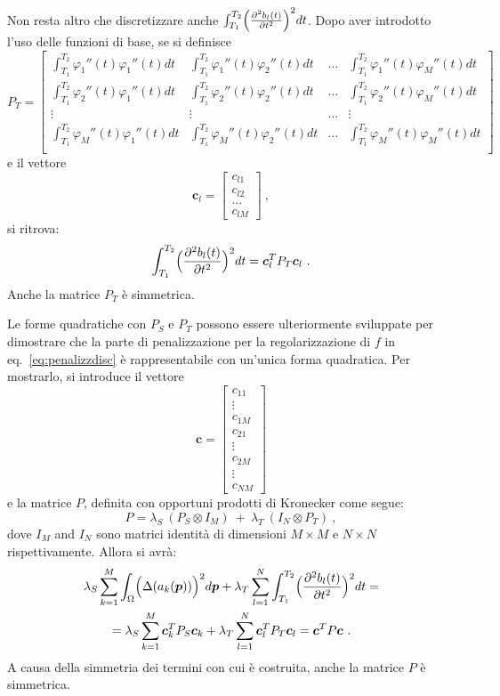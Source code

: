 \documentclass[a4paper,11pt,twoside,openright]{book}							%
\begin{document}
Non resta altro che discretizzare anche $\int_{T_1}^{T_2} \Bigl( \frac{\partial^2   b_l(t)   }{\partial t ^2} \Bigr)^2 dt$. Dopo aver introdotto l'uso delle funzioni di base, se si definisce 
 $$ P_T = \begin{bmatrix}
\int_{T_1}^{T_2} \varphi_1''(t) \varphi_1''(t) dt  & \int_{T_1}^{T_2} \varphi_1''(t) \varphi_2''(t) dt & \hdots & \int_{T_1}^{T_2} \varphi_1''(t) \varphi_M''(t) dt  \\
\int_{T_1}^{T_2} \varphi_2''(t) \varphi_1''(t) dt  & \int_{T_1}^{T_2} \varphi_2''(t) \varphi_2''(t) dt & \hdots & \int_{T_1}^{T_2} \varphi_2''(t) \varphi_M''(t) dt  \\
\vdots & \vdots & \hdots & \vdots \\
\int_{T_1}^{T_2} \varphi_M''(t) \varphi_1''(t) dt  & \int_{T_1}^{T_2} \varphi_M''(t) \varphi_2''(t) dt & \hdots & \int_{T_1}^{T_2} \varphi_M''(t) \varphi_M''(t) dt  \\
\end{bmatrix} $$
e il vettore $$
\bm{c}_l =
\begin{bmatrix}
c_{l1} \\ c_{l2} \\ \hdots \\ c_{lM}
\end{bmatrix} \ ,$$ si ritrova:
$$
\int_{T_1}^{T_2} \Bigl( \frac{\partial^2   b_l(t)   }{\partial t ^2} \Bigr)^2 dt = \bm{c}_l^T  P_T \bm{c}_l \ .
$$
Anche la matrice $P_T$ è simmetrica.

Le forme quadratiche con $P_S$ e $P_T$ possono essere ulteriormente sviluppate per dimostrare che la parte di penalizzazione per la regolarizzazione di $f$ in eq.~\ref{eq:penalizzdisc} è rappresentabile con un'unica forma quadratica. Per mostrarlo, si introduce il vettore
$$\bm c =
\begin{bmatrix}
c_{11}  \\
\vdots\\
c_{1M}  \\
c_{21}  \\
\vdots\\
c_{2M}  \\
\vdots\\
c_{NM}
\end{bmatrix}
$$
e la matrice $P$, definita con opportuni prodotti di Kronecker come segue:
$$
P = \lambda_S\    (P_S \otimes I_M)   \ +\  \lambda_T\   (I_N \otimes P_T) \ ,
$$
dove $I_M$ and $I_N$ sono matrici identità di dimensioni $M \times M$ e $N \times N$ rispettivamente. Allora si avrà:
\begin{multline}
\lambda_S  \sum_{k=1}^M \int_{\Omega} \Bigl( \Delta(  a_k(\bm p)  ) \Bigr)^2 d \bm p + \lambda_T \sum_{l=1}^N\int_{T_1}^{T_2} \Bigl( \frac{\partial^2   b_l(t)   }{\partial t ^2} \Bigr)^2 dt =
\\ = \lambda_S\sum_{k=1}^M\bm{c}_k^T P_S \bm{c}_k + \lambda_T\sum_{l=1}^N\bm{c}_l^T P_T \bm{c}_l = \bm{c}^T P \bm{c} \ .
\end{multline}
A causa della simmetria dei termini con cui è costruita, anche la matrice $P$ è simmetrica.
\end{document}
